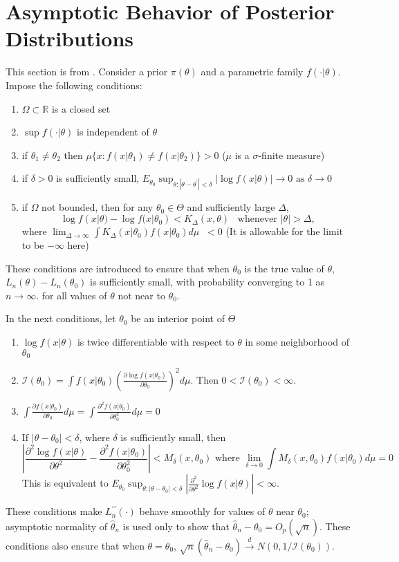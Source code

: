 \documentclass[letterpaper,11pt]{article}
\newcounter{Ax}
\newcounter{Bx}
\newcommand{\itemA}{%
    \addtocounter{Ax}{1}
    \item[A\theAx.]}
\newcommand{\itemB}{%
    \addtocounter{Bx}{1}
    \item[B\theBx.]}
\newcommand{\R}{\mathbb{R}}
\newcommand{\convdist}{\overset{d}\rightarrow}
\newcommand{\conv}{\rightarrow}
\newcommand{\FI}{\mathcal{I}}
\theoremstyle{definition}
\begin{document}
\section{Asymptotic Behavior of Posterior Distributions}
This section is from \citet{walkerAsymptoticBehaviourPosterior1969}. Consider a prior $\pi(\theta)$ and a parametric family $f(\cdot|\theta)$. Impose the following conditions:
\begin{enumerate}
\itemA $\Omega\subset\R$ is a closed set
\itemA $\sup f(\cdot|\theta)$ is independent of $\theta$
\itemA if $\theta_1 \neq \theta_2$ then $\mu\{x: f(x|\theta_1)\neq f(x|\theta_2)\} > 0$ ($\mu$ is a $\sigma$-finite measure)
\itemA if $\delta>0$ is sufficiently small, $E_{\theta_0} \displaystyle\sup_{\theta:|\theta-\theta^\prime|<\delta}\left|\log f(x|\theta)\right| \conv 0 \text{ as }\delta\conv0$
\itemA if $\Omega$ not bounded, then for any $\theta_0\in\Theta$ and sufficiently large $\Delta$, $$\log f(x|\theta)-\log f(x|\theta_0) < K_\Delta(x,\theta) \;\;\; \text{whenever }|\theta|>\Delta,$$
where $\displaystyle\lim_{\Delta\rightarrow\infty}\int K_\Delta(x|\theta_0)f(x|\theta_0)d\mu\;\;<0$
(It is allowable for the limit to be $-\infty$ here)
\end{enumerate}
These conditions are introduced to ensure that when $\theta_0$ is the true value of $\theta$, $L_n(\theta)-L_n(\theta_0)$ is sufficiently small, with probability converging to 1 as $n\conv\infty$. for all values of $\theta$ not near to $\theta_0$.

In the next conditions, let $\theta_0$ be an interior point of $\Theta$
\begin{enumerate}
\itemB $\log f(x|\theta)$ is twice differentiable with respect to $\theta$ in some neighborhood of $\theta_0$
\itemB $\FI(\theta_0) =\displaystyle\int f(x|\theta_0)\left(\frac{\partial\log f(x|\theta_0)}{\partial\theta_0}\right)^2d\mu$. Then $0<\FI(\theta_0)<\infty$.
\itemB $\displaystyle\int\frac{\partial f(x|\theta_0)}{\partial\theta_0} d\mu = \int \frac{\partial^2 f(x|\theta_0)}{\partial\theta_0^2} d\mu=0$
\itemB If $|\theta-\theta_0|<\delta$, where $\delta$ is sufficiently small, then $$\left|\frac{\partial^2\log f(x|\theta)}{\partial\theta^2} - \frac{\partial^2 f(x|\theta_0)}{\partial\theta_0^2}\right|<M_\delta(x,\theta_0) \text{ where }\lim_{\delta\rightarrow 0}\int M_\delta(x,\theta_0)f(x|\theta_0)d\mu = 0$$
This is equivalent to $\displaystyle E_{\theta_0}\sup_{\theta:|\theta-\theta_0|<\delta} \left|\frac{\partial^2}{\partial\theta^2} \log f(x|\theta)\right|<\infty.$
\end{enumerate}
These conditions make $L^{\prime\prime}_n(\cdot)$ behave smoothly for values of $\theta$ near $\theta_0$; asymptotic normality of $\hat\theta_n$ is used only to show that $\hat\theta_n-\theta_0 = O_p(\sqrt{n})$. These conditions also ensure that when $\theta=\theta_0$, $\sqrt{n}(\hat\theta_n-\theta_0) \convdist N(0,1/\FI(\theta_0))$.
\end{document}
